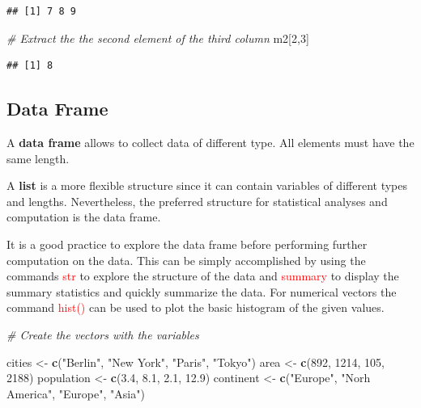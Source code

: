 \documentclass[
]{book}
\newenvironment{Shaded}{\begin{snugshade}}{\end{snugshade}}
\newcommand{\CommentTok}[1]{\textcolor[rgb]{0.56,0.35,0.01}{\textit{#1}}}
\newcommand{\DecValTok}[1]{\textcolor[rgb]{0.00,0.00,0.81}{#1}}
\newcommand{\FloatTok}[1]{\textcolor[rgb]{0.00,0.00,0.81}{#1}}
\newcommand{\FunctionTok}[1]{\textcolor[rgb]{0.13,0.29,0.53}{\textbf{#1}}}
\newcommand{\NormalTok}[1]{#1}
\newcommand{\OtherTok}[1]{\textcolor[rgb]{0.56,0.35,0.01}{#1}}
\newcommand{\StringTok}[1]{\textcolor[rgb]{0.31,0.60,0.02}{#1}}
\begin{document}
\begin{verbatim}
## [1] 7 8 9
\end{verbatim}

\begin{Shaded}
\begin{Highlighting}[]
\CommentTok{\# Extract the the second element of the third column}
\NormalTok{m2[}\DecValTok{2}\NormalTok{,}\DecValTok{3}\NormalTok{]}
\end{Highlighting}
\end{Shaded}

\begin{verbatim}
## [1] 8
\end{verbatim}

\hypertarget{data-frame}{%
\subsection{Data Frame}\label{data-frame}}

A \textbf{data frame} allows to collect data of different type.
All elements must have the same length.

A \textbf{list} is a more flexible structure since it can contain variables of different types and lengths.
Nevertheless, the preferred structure for statistical analyses and computation is the data frame.

It is a good practice to explore the data frame before performing further computation on the data.
This can be simply accomplished by using the commands \textcolor{red}{str} to explore the structure of the data and \textcolor{red}{summary} to display the summary statistics and quickly summarize the data.
For numerical vectors the command \textcolor{red}{hist()} can be used to plot the basic histogram of the given values.

\begin{Shaded}
\begin{Highlighting}[]
\CommentTok{\# Create the vectors with the variables}

\NormalTok{cities }\OtherTok{\textless{}{-}} \FunctionTok{c}\NormalTok{(}\StringTok{"Berlin"}\NormalTok{, }\StringTok{"New York"}\NormalTok{, }\StringTok{"Paris"}\NormalTok{, }\StringTok{"Tokyo"}\NormalTok{)}
\NormalTok{area }\OtherTok{\textless{}{-}} \FunctionTok{c}\NormalTok{(}\DecValTok{892}\NormalTok{, }\DecValTok{1214}\NormalTok{, }\DecValTok{105}\NormalTok{, }\DecValTok{2188}\NormalTok{)}
\NormalTok{population }\OtherTok{\textless{}{-}} \FunctionTok{c}\NormalTok{(}\FloatTok{3.4}\NormalTok{, }\FloatTok{8.1}\NormalTok{, }\FloatTok{2.1}\NormalTok{, }\FloatTok{12.9}\NormalTok{)}
\NormalTok{continent }\OtherTok{\textless{}{-}} \FunctionTok{c}\NormalTok{(}\StringTok{"Europe"}\NormalTok{, }\StringTok{"Norh America"}\NormalTok{, }\StringTok{"Europe"}\NormalTok{, }\StringTok{"Asia"}\NormalTok{)}
\end{Highlighting}
\end{Shaded}
\end{document}
